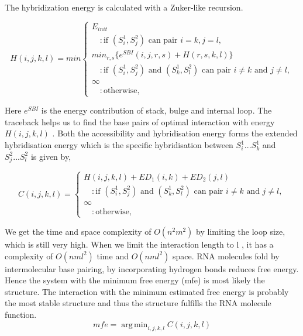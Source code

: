 \documentclass[twoside,a4paper]{report}
\DeclareMathOperator*{\argmin}{arg\,min}
\begin{document}
	The hybridization energy is calculated with a Zuker-like recursion.
	
	\begin{equation}
	H(i,j,k,l) = min \begin{cases}
	E_{init} \\
		\quad : \text{if $(S_i^1 , S_j^2 )$ can pair $i =k , j=l $}, \\	
	min_{r,s}\{ e^{SBI}(i,j,r,s)+ H(r,s,k,l)\} \\
	 \quad 	: \text{if $(S_i^1 , S_j^2 )$ and $(S_k^1 , S_l^2)$ can pair $i \neq k $ and $j \neq l $} ,\\
	\infty \\
	\quad : \text{otherwise},
	\end{cases}
	\end{equation}
	
	Here $e^{SBI} $ is the energy contribution of stack, bulge and internal loop. The traceback helps us to find the base pairs of optimal interaction with energy $H(i,j,k,l)$ . Both the accessibility and hybridisation energy forms the extended hybridisation energy which is the specific hybridisation between $S_i^1...S_k^1$ and  $S_j^2...S_l^2$ is given by, 
	
		\begin{equation}
	C(i,j,k,l) =  \begin{cases}
	H(i, j, k , l) + ED_1(i, k) + ED_2(j, l) \\
	\quad 	: \text{if $(S_i^1 , S_j^2 )$ and $(S_k^1 , S_l^2)$ can pair $i \neq k $ and $j \neq l $} ,\\
	\infty \\
	\quad : \text{otherwise},
	\end{cases}
	\end{equation}
	
	We get the time and space complexity of $O(n^2m^2)$ by limiting the loop size, which is still very high. When we limit the interaction length to l , it has a complexity of $O(nml^2)$ time and $O(nml^2)$ space. RNA molecules fold by intermolecular base pairing, by incorporating hydrogen bonds reduces free energy. Hence the system with the minimum free energy (mfe) is most likely the structure. The interaction with the minimum estimated free energy is probably the most stable structure and thus the structure fulfills the RNA molecule function.\\
	
	 \begin{equation*}
	mfe = \argmin_{i,j,k,l} C(i,j,k,l)
	\end{equation*}
\end{document}
